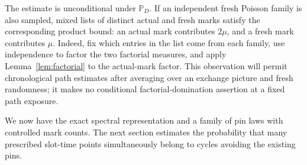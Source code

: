 The estimate is unconditional under $\mathbb P_D$.  If an independent
fresh Poisson family is also sampled, mixed lists of distinct actual
and fresh marks satisfy the corresponding product bound: an actual
mark contributes $2\mu$, and a fresh mark contributes $\mu$.
Indeed, fix which entries in the list come from each family, use
independence to factor the two factorial measures, and apply
Lemma~\ref{lem:factorial} to the actual-mark factor.  This observation
will permit chronological path estimates after averaging over an
exchange picture and fresh randomness; it makes no conditional
factorial-domination assertion at a fixed path exposure.

We now have the exact spectral representation and a family of pin
laws with controlled mark counts.  The next section estimates the
probability that many prescribed slot-time points simultaneously
belong to cycles avoiding the existing pins.
